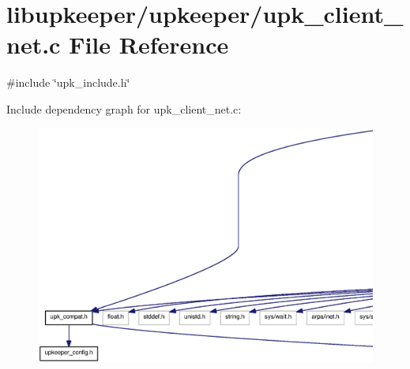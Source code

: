 \section{libupkeeper/upkeeper/upk\_\-client\_\-net.c File Reference}
\label{upk__client__net_8c}
{\ttfamily \#include \char`\"{}upk\_\-include.h\char`\"{}}\par
Include dependency graph for upk\_\-client\_\-net.c:\nopagebreak
\begin{figure}[H]
\begin{center}
\leavevmode
\includegraphics[width=400pt]{upk__client__net_8c__incl}
\end{center}
\end{figure}
